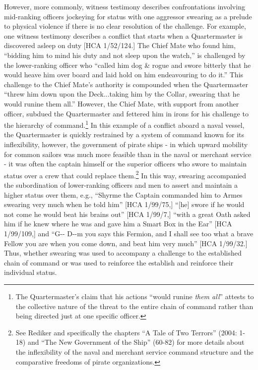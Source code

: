 However, more commonly, witness testimony describes confrontations involving mid-ranking officers jockeying for status with one aggressor swearing as a prelude to physical violence if there is no clear resolution of the challenge. For example, one witness testimony describes a conflict that starts when a Quartermaster is discovered asleep on duty [HCA 1/52/124.] The Chief Mate who found him, “bidding him to mind his duty and not sleep upon the watch,” is challenged by the lower-ranking officer who “called him dog \& rogue and swore bitterly that he would heave him over board and laid hold on him endeavouring to do it.” This challenge to the Chief Mate’s authority is compounded when the Quartermaster “threw him down upon the Deck...taking him by the Collar, swearing that he would runine them all.” However, the Chief Mate, with support from another officer, subdued the Quartermaster and fettered him in irons for his challenge to the hierarchy of command.\footnote{The Quartermaster’s claim that his actions “would runine \textit{them all}” attests to the collective nature of the threat to the entire chain of command rather than being directed just at one specific officer.}  In this example of a conflict aboard a naval vessel, the Quartermaster is quickly restrained by a system of command known for its inflexibility, however, the government of pirate ships - in which upward mobility for common sailors was much more feasible than in the naval or merchant service - it was often the captain himself or the superior officers who swore to maintain status over a crew that could replace them.\footnote{See Rediker and specifically the chapters “A Tale of Two Terrors” (2004: 1-18) and “The New Government of the Ship” (60-82) for more details about the inflexibility of the naval and merchant service command structure and the comparative freedoms of pirate organizations.}  In this way, swearing accompanied the subordination of lower-ranking officers and men to assert and maintain a higher status over them, e.g., “Shyrme the Captain commanded him to Armes swearing very much when he told him” [HCA 1/99/75,] “[he] swore if he would not come he would beat his brains out” [HCA 1/99/7,] “with a great Oath asked him if he knew where he was and gave him a Smart Box in the Ear” [HCA 1/99/109,] and “G-{}- D-{}-m you says this Fermion, and I shall see too what a brave Fellow you are when you come down, and beat him very much” [HCA 1/99/32.] Thus, whether swearing was used to accompany a challenge to the established chain of command or was used to reinforce the   establish and reinforce their individual status.

